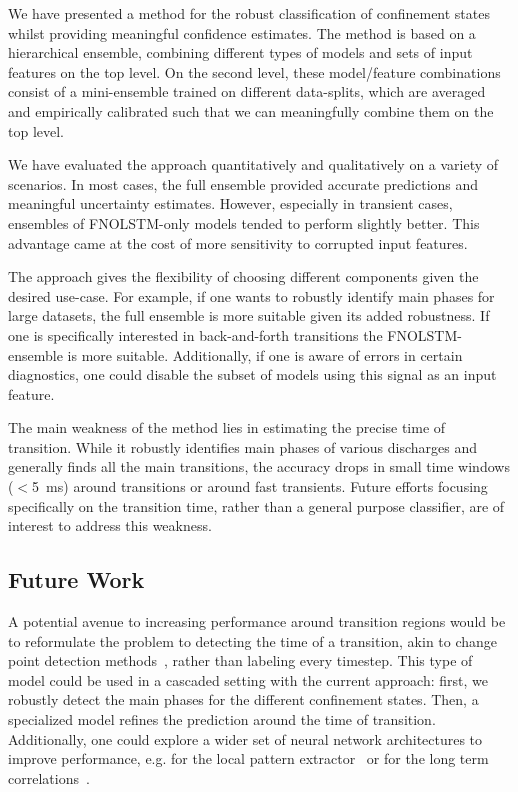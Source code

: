 We have presented a method for the robust classification of confinement states whilst providing meaningful confidence estimates. The method is based on a hierarchical ensemble, combining different types of models and sets of input features on the top level. On the second level, these model/feature combinations consist of a mini-ensemble trained on different data-splits, which are averaged and empirically calibrated such that we can meaningfully combine them on the top level.

We have evaluated the approach quantitatively and qualitatively on a variety of scenarios. In most cases, the full ensemble provided accurate predictions and meaningful uncertainty estimates. However, especially in transient cases, ensembles of FNOLSTM-only models tended to perform slightly better. This advantage came at the cost of more sensitivity to corrupted input features. 

The approach gives the flexibility of choosing different components given the desired use-case. For example, if one wants to robustly identify main phases for large datasets, the full ensemble is more suitable given its added robustness. If one is specifically interested in back-and-forth transitions the FNOLSTM-ensemble is more suitable. Additionally, if one is aware of errors in certain diagnostics, one could disable the subset of models using this signal as an input feature.

The main weakness of the method lies in estimating the precise time of transition. While it robustly identifies main phases of various discharges and generally finds all the main transitions, the accuracy drops in small time windows ($<$\SI{5}{\milli\second}) around transitions or around fast transients. Future efforts focusing specifically on the transition time, rather than a general purpose classifier, are of interest to address this weakness.

\subsection{Future Work}
A potential avenue to increasing performance around transition regions would be to reformulate the problem to detecting the time of a transition, akin to change point detection methods~\cite{aminikhanghahi2016}, rather than labeling every timestep. This type of model could be used in a cascaded setting with the current approach: first, we robustly detect the main phases for the different confinement states. Then, a specialized model refines the prediction around the time of transition. Additionally, one could explore a wider set of neural network architectures to improve performance, e.g. for the local pattern extractor~\cite{ho2020,Liu2021ICCV,kovachki2021neural} or for the long term correlations~\cite{vaswani2017,beck2024xlstm,gu2024mamba}.

